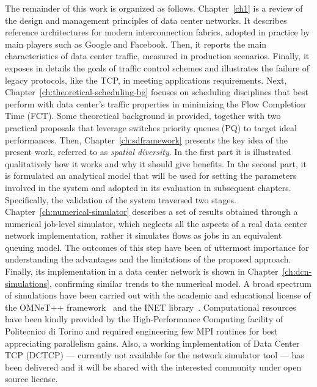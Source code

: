 The remainder of this work is organized as follows. Chapter~\ref{ch1} is a review of the design and management principles of data center networks. It describes reference architectures for modern interconnection fabrics, adopted in practice by main players such as Google and Facebook. Then, it reports the main characteristics of data center traffic, measured in production scenarios. Finally, it exposes in details the goals of traffic control schemes and illustrates the failure of legacy protocols, like the TCP, in meeting applications requirements. Next, Chapter~\ref{ch:theoretical-scheduling-bg} focuses on scheduling disciplines that best perform with data center's traffic properties in minimizing the Flow Completion Time (FCT). Some theoretical background is provided, together with two practical proposals that leverage switches priority queues (PQ) to target ideal performances. Then, Chapter~\ref{ch:sdframework} presents the key idea of the present work, referred to as \emph{spatial diversity}. In the first part it is illustrated qualitatively how it works and why it should give benefits. In the second part, it is formulated an analytical model that will be used for setting the parameters involved in the system and adopted in its evaluation in subsequent chapters. Specifically, the validation of the system traversed two stages. Chapter~\ref{ch:numerical-simulator} describes a set of results obtained through a numerical job-level simulator, which neglects all the aspects of a real data center network implementation, rather it simulates flows as jobs in an equivalent queuing model. The outcomes of this step have been of uttermost importance for understanding the advantages and the limitations of the proposed approach. Finally, its implementation in a data center network is shown in Chapter~\ref{ch:dcn-simulations}, confirming similar trends to the numerical model. A broad spectrum of simulations have been carried out with the academic and educational license of the OMNeT++ framework~\cite{omnetpp} and the INET library~\cite{inet}. Computational resources have been kindly provided by the High-Performance Computing facility of Politecnico di Torino and required engineering few MPI routines for best appreciating parallelism gains. Also, a working implementation of Data Center TCP (DCTCP) --- currently not available for the network simulator tool ---  has been delivered and it will be shared with the interested community under open source license.
